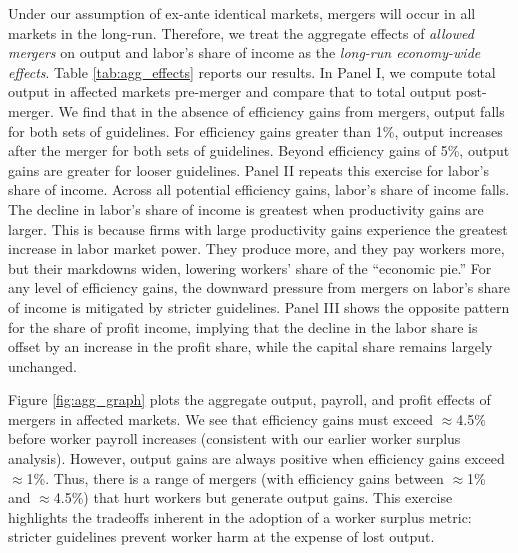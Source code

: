 \documentclass[12pt]{article}
\theoremstyle{prop}
\begin{document}
Under our assumption of ex-ante identical markets, mergers will occur in all markets in the long-run. Therefore, we treat the aggregate effects of \textit{allowed mergers} on output and labor's share of income as the \textit{long-run economy-wide effects}. Table \ref{tab:agg_effects} reports our results. In Panel I, we compute total output in affected markets pre-merger and compare that to total output post-merger.  We find that in the absence of efficiency gains from mergers, output falls for both sets of guidelines. For efficiency gains greater than 1\%, output increases after the merger for both sets of guidelines. Beyond efficiency gains of 5\%, output gains are greater for looser guidelines. Panel II repeats this exercise for labor's share of income. Across all potential efficiency gains, labor's share of income falls. The decline in labor's share of income is greatest when productivity gains are larger. This is because firms with large productivity gains experience the greatest increase in labor market power. They produce more, and they pay workers more, but their markdowns widen, lowering workers' share of the ``economic pie.'' For any level of efficiency gains, the downward pressure from mergers on labor's share of income is mitigated by stricter guidelines. Panel III shows the opposite pattern for the share of profit income, implying that the decline in the labor share is offset by an increase in the profit share, while the capital share remains largely unchanged.
	
Figure \ref{fig:agg_graph}	plots the aggregate output, payroll, and profit effects of mergers in affected markets. We see that efficiency gains must exceed $\approx$4.5\% before worker payroll increases (consistent with our earlier worker surplus analysis). However, output gains are always positive when efficiency gains exceed $\approx$1\%. Thus, there is a range of mergers (with efficiency gains between $\approx$1\% and $\approx$4.5\%) that hurt workers but generate output gains. This exercise highlights the tradeoffs inherent in the adoption of a worker surplus metric: stricter guidelines prevent worker harm at the expense of lost output.
 
\end{document}
